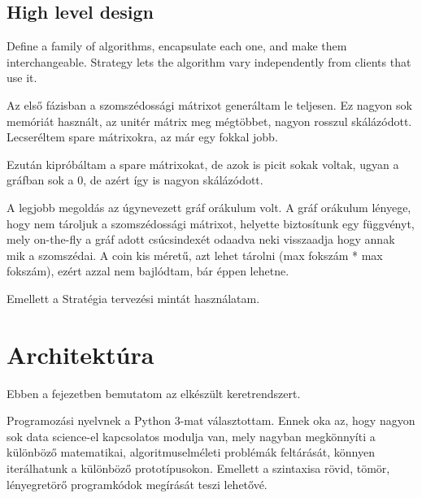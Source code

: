 \section{High level design}


Define a family of algorithms, encapsulate each one, and make them
interchangeable. Strategy lets the algorithm vary independently from clients that
use it.













Az első fázisban a szomszédossági mátrixot generáltam le teljesen. Ez nagyon sok memóriát használt, az unitér mátrix meg mégtöbbet, nagyon rosszul skálázódott. Lecseréltem spare mátrixokra, az már egy fokkal jobb.


Ezután kipróbáltam a spare mátrixokat, de azok is picit sokak voltak, ugyan a gráfban sok a 0, de azért
így is nagyon skálázódott.

A legjobb megoldás az úgynevezett gráf orákulum volt. A gráf orákulum lényege, hogy nem tároljuk a szomszédossági mátrixot, helyette biztosítunk egy függvényt, mely on-the-fly a gráf adott csúcsindexét odaadva neki visszaadja hogy annak mik a szomszédai. A coin kis méretű, azt lehet tárolni (max fokszám * max fokszám), ezért azzal nem bajlódtam, bár éppen lehetne.

Emellett a Stratégia tervezési mintát használatam.


\chapter{Architektúra}


Ebben a fejezetben bemutatom az elkészült keretrendszert.

Programozási nyelvnek a Python 3-mat választottam. Ennek oka az, hogy nagyon sok data science-el kapcsolatos modulja van, mely nagyban megkönnyíti a különböző matematikai, algoritmuselméleti problémák feltárását, könnyen iterálhatunk a különböző prototípusokon. Emellett a szintaxisa rövid, tömör, lényegretörő programkódok megírását teszi lehetővé.

